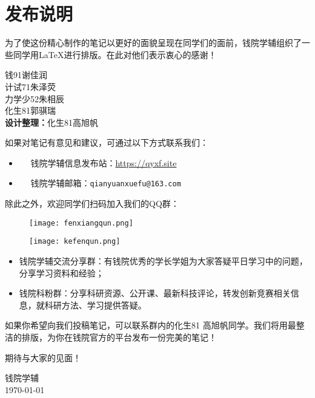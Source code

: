 \chapter*{发布说明}

为了使这份精心制作的笔记以更好的面貌呈现在同学们的面前，钱院学辅组织了一些同学用\LaTeX 进行排版。在此对他们表示衷心的感谢！
\vspace{0.5em}

\begin{tcolorbox}[title={\bfseries 参与排版成员}]
	 钱91\hspace{6pt}谢佳润\\
	 计试71\hspace{6pt}朱泽荧\\
	 力学少52\hspace{6pt}朱相辰\\	
	 化生81\hspace{6pt}郭骐瑞\\
	 \textbf{设计整理：}化生81\hspace{6pt}高旭帆
\end{tcolorbox}


如果对笔记有意见和建议，可通过以下方式联系我们：

\begin{itemize}
	\item \faInternetExplorer ~~ 钱院学辅信息发布站：\url{https://qyxf.site}
	\item \faEnvelopeOpen ~~ 钱院学辅邮箱：\texttt{qianyuanxuefu@163.com}
\end{itemize}

除此之外，欢迎同学们扫码加入我们的QQ群：

\begin{figure}[!ht]
	\centering
	\begin{minipage}[c]{0.45\textwidth}
		\centering
		\texttt{[image: fenxiangqun.png]}
	\end{minipage}%
	\quad
	\begin{minipage}[c]{0.45\textwidth}
		\centering
		\texttt{[image: kefenqun.png]}
	\end{minipage}
\end{figure}

\newpage\thispagestyle{empty}

\begin{itemize}
	\item 钱院学辅交流分享群：有钱院优秀的学长学姐为大家答疑平日学习中的问题，分享学习资料和经验；
	\item 钱院科粉群：分享科研资源、公开课、最新科技评论，转发创新竞赛相关信息，就科研方法、学习提供答疑。
\end{itemize}

如果你希望向我们投稿笔记，可以联系群内的化生81 高旭帆同学。我们将用最整洁的排版，为你在钱院官方的平台发布一份完美的笔记！

期待与大家的见面！

\begin{flushright}
	钱院学辅\\
	\today
\end{flushright}

